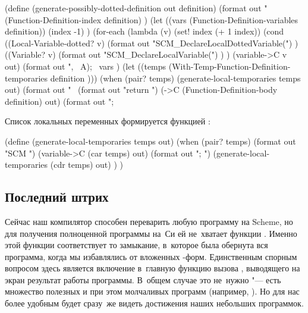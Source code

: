 \begin{code:lisp}
(define (generate-possibly-dotted-definition out definition)
  (format out "~%
          (Function-Definition-index definition) )
  (let ((vars (Function-Definition-variables definition))
        (index -1) )
    (for-each (lambda (v)
                (set! index (+ 1 index))
                (cond ((Local-Variable-dotted? v)
                       (format out "SCM_DeclareLocalDottedVariable(") )
                      ((Variable? v)
                       (format out "SCM_DeclareLocalVariable(") ) )
                (variable->C v out)
                (format out ", ~A);~%
              vars )
    (let ((temps (With-Temp-Function-Definition-temporaries
                  definition )))
      (when (pair? temps)
        (generate-local-temporaries temps out)
        (format out "~%
    (format out "return ")
    (->C (Function-Definition-body definition) out)
    (format out ";~%
\end{code:lisp}

Список локальных переменных формируется функцией
:

\begin{code:lisp}
(define (generate-local-temporaries temps out)
  (when (pair? temps)
    (format out "SCM ")
    (variable->C (car temps) out)
    (format out "; ")
    (generate-local-temporaries (cdr temps) out) ) )
\end{code:lisp}


\subsection{Последний штрих}\label{cc/gen/ssect:init}

Сейчас наш компилятор способен переварить любую программу на Scheme, но для
получения полноценной программы на~Си ей не~хватает функции . Именно
этой функции соответствует то замыкание, в~которое была обернута вся программа,
когда мы избавлялись от вложенных -форм.
 Единственным спорным вопросом здесь является включение в~главную функцию вызова
, выводящего на экран результат работы программы. В~общем случае
это не~нужно "--- есть множество полезных и при этом молчаливых программ
(например, ). Но для нас более удобным будет сразу~же видеть достижения
наших небольших программок.

